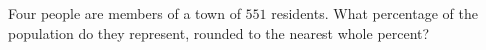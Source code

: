 Four people are members of a town of $551$ residents. What percentage of the population do they represent, rounded to the nearest whole percent?
